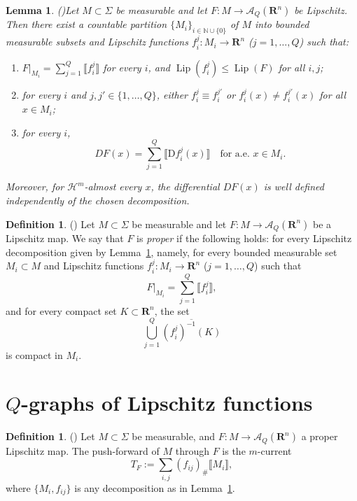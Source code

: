 \documentclass[a4paper,twoside,reqno]{article}
\theoremstyle{definition}
\theoremstyle{remark}
\theoremstyle{plain}
\newtheorem{lemma}[theorem]{Lemma}
\theoremstyle{remark}
\theoremstyle{definition}
\newtheorem{definition}[theorem]{Definition}
\newcommand{\natp}{\mathbb{N}}
\newcommand{\nat}{\natp \cup \{0\}}
\newcommand{\R}{\mathbf{R}}
\newcommand{\HM}{\mathscr{H}}
\newcommand{\uD}{\ensuremath{\mathrm{D}}}
\newcommand{\qspace}[1]{\mathcal{A}_{{#1}}}
\begin{document}
\begin{lemma}(\cite[1.1]{delellis2013multiplevaluedfunctionsintegral})\label{lem:1.1}
    Let $M \subset \Sigma$ be measurable and let
    $F : M \to \qspace{Q}(\R^n)$ be Lipschitz.
    Then there exist a countable partition $\{M_i\}_{i\in \nat}$ of $M$ into bounded
    measurable subsets and Lipschitz functions
    $f_i^j : M_i \to \R^n$ ($j = 1,\ldots,Q$) such that:
    \begin{enumerate}
        \item
        $F|_{M_i} = \sum_{j=1}^Q \llbracket f_i^j \rrbracket$ for every $i$, and
        $\operatorname{Lip}(f_i^j) \le \operatorname{Lip}(F)$ for all $i,j$;

        \item
        for every $i$ and $j,j' \in \{1,\ldots,Q\}$, either
        $f_i^j \equiv f_i^{j'}$ or
        $f_i^j(x) \neq f_i^{j'}(x)$ for all $x \in M_i$;

        \item
        for every $i$,
        \[
        DF(x)
        =
        \sum_{j=1}^Q \llbracket \uD f_i^j(x) \rrbracket
        \quad \text{for a.e.\ } x \in M_i .
        \]
    \end{enumerate}
    Moreover, for $\HM^m$-almost every $x$, the differential $DF(x)$ is well
    defined independently of the chosen decomposition.
\end{lemma}

\begin{definition}(\cite[1.2]{delellis2013multiplevaluedfunctionsintegral})
    Let $M \subset \Sigma$ be measurable and let
    $F \colon M \to \qspace{Q}(\R^n)$ be a Lipschitz map.
    We say that $F$ is \emph{proper} if the following holds:
    for every Lipschitz decomposition given by Lemma~\ref{lem:1.1}, namely,
    for every bounded measurable set $M_i \subset M$ and Lipschitz functions
    $f_i^j \colon M_i \to \R^n$ ($j=1,\dots,Q$) such that
    \[
        F|_{M_i} = \sum_{j=1}^Q \llbracket f_i^j \rrbracket,
    \]
    and for every compact set $K \subset \R^n$, the set
    \[
        \bigcup_{j=1}^Q \overline{(f_i^j)^{-1}(K)}
    \]
    is compact in $M_i$.
\end{definition}

\section{$Q$-graphs of Lipschitz functions}\label{section:q_graphs}

\begin{definition}(\cite[1.3]{delellis2013multiplevaluedfunctionsintegral})
    Let $M \subset \Sigma$ be measurable, and
    $F : M \to \mathcal A_Q(\R^n)$ a proper Lipschitz map.
    The push-forward of $M$ through $F$ is the $m$-current
    \[
        T_F := \sum_{i,j} (f_{ij})_\# \llbracket M_i \rrbracket,
    \]
    where $\{M_i,f_{ij}\}$ is any decomposition as in Lemma~\ref{lem:1.1}.
\end{definition}
\end{document}
